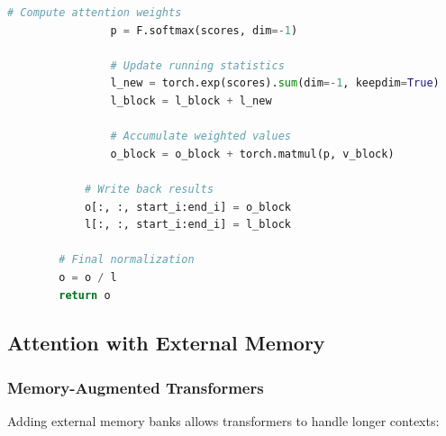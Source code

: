 \begin{lstlisting}[language=Python, caption=Flash Attention Concept]
                # Compute attention weights
                p = F.softmax(scores, dim=-1)

                # Update running statistics
                l_new = torch.exp(scores).sum(dim=-1, keepdim=True)
                l_block = l_block + l_new

                # Accumulate weighted values
                o_block = o_block + torch.matmul(p, v_block)

            # Write back results
            o[:, :, start_i:end_i] = o_block
            l[:, :, start_i:end_i] = l_block

        # Final normalization
        o = o / l
        return o
\end{lstlisting}

\subsection{Attention with External Memory}

\subsubsection{Memory-Augmented Transformers}

Adding external memory banks allows transformers to handle longer contexts:

